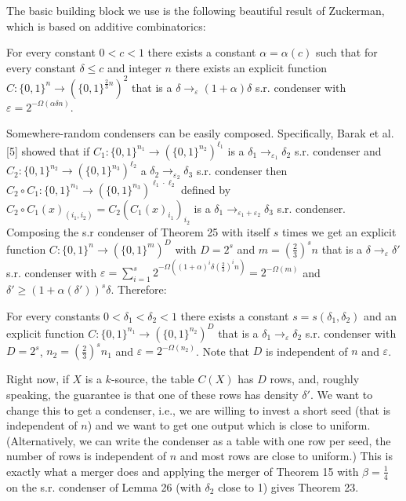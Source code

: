 The basic building block we use is the following beautiful result of Zuckerman, which is based on additive combinatorics:
\begin{theorem}[{[45, Theorem 8.3]}]
For every constant $0<c<1$ there exists a constant $\alpha=\alpha(c)$ such that for every constant $\delta\le c$ and integer $n$ there exists an explicit function $C:\{0,1\}^n\to(\{0,1\}^{\frac23n})^2$ that is a $\delta\to_\varepsilon(1+\alpha)\delta$ s.r. condenser with $\varepsilon=2^{-\Omega(\alpha\delta n)}$.
\end{theorem}
Somewhere-random condensers can be easily composed. Specifically, Barak et al. [5] showed that if $C_1:\{0,1\}^{n_1}\to(\{0,1\}^{n_2})^{\ell_1}$ is a $\delta_1\to_{\varepsilon_1}\delta_2$ s.r. condenser and $C_2:\{0,1\}^{n_2}\to(\{0,1\}^{n_3})^{\ell_2}$ a $\delta_2\to_{\varepsilon_2}\delta_3$ s.r. condenser then $C_2\circ C_1:\{0,1\}^{n_1}\to(\{0,1\}^{n_3})^{\ell_1\cdot\ell_2}$ defined by $C_2\circ C_1(x)_{(i_1,i_2)}=C_2(C_1(x)_{i_1})_{i_2}$ is a $\delta_1\to_{\varepsilon_1+\varepsilon_2}\delta_3$ s.r. condenser.
Composing the s.r condenser of Theorem 25 with itself $s$ times we get an explicit function $C:\{0,1\}^n\to(\{0,1\}^m)^D$ with $D=2^s$ and $m=(\frac23)^sn$ that is a $\delta\to_\varepsilon\delta'$ s.r. condenser with $\varepsilon=\sum_{i=1}^s2^{-\Omega((1+\alpha)^i\delta(\frac23)^in)}=2^{-\Omega(m)}$ and $\delta'\ge(1+\alpha(\delta'))^s\delta$. Therefore:
\begin{lemma}
For every constants $0<\delta_1<\delta_2<1$ there exists a constant $s=s(\delta_1,\delta_2)$ and an explicit function $C:\{0,1\}^{n_1}\to(\{0,1\}^{n_2})^D$ that is a $\delta_1\to_\varepsilon\delta_2$ s.r. condenser with $D=2^s$, $n_2=(\frac23)^sn_1$ and $\varepsilon=2^{-\Omega(n_2)}$. Note that $D$ is independent of $n$ and $\varepsilon$.
\end{lemma}
Right now, if $X$ is a $k$-source, the table $C(X)$ has $D$ rows, and, roughly speaking, the guarantee is that one of these rows has density $\delta'$. We want to change this to get a condenser, i.e., we are willing to invest a short seed (that is independent of $n$) and we want to get one output which is close to uniform. (Alternatively, we can write the condenser as a table with one row per seed, the number of rows is independent of $n$ and most rows are close to uniform.) This is exactly what a merger does and applying the merger of Theorem 15 with $\beta=\frac14$ on the s.r. condenser of Lemma 26 (with $\delta_2$ close to 1) gives Theorem 23.
